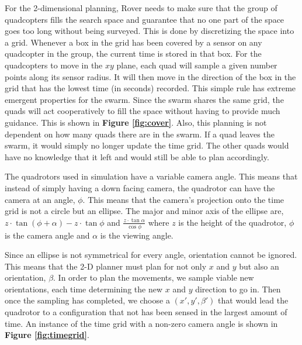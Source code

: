 \documentclass[12pt]{article}
\newcommand{\fig}[1]{\textbf{Figure \ref{fig:#1}}}
\begin{document}
For the 2-dimensional planning, Rover needs to make sure that the group of
quadcopters fills the search space and guarantee that no one part of the space
goes too long without being surveyed. This is done by discretizing the space
into a grid. Whenever a box in the grid has been covered by a sensor on any
quadcopter in the group, the current time is stored in that box.  For the
quadcopters to move in the $xy$ plane, each quad will sample a given number
points along its sensor radius. It will then move in the direction of the box
in the grid that has the lowest time (in seconds) recorded. This simple rule
has extreme emergent properties for the swarm. Since the swarm shares the same
grid, the quads will act cooperatively to fill the space without having to
provide much guidance. This is shown in \fig{cover}. Also, this planning is not
dependent on how many quads there are in the swarm. If a quad leaves the swarm,
it would simply no longer update the time grid. The other quads would have no
knowledge that it left and would still be able to plan accordingly. 

The quadrotors used in simulation have a variable camera angle. This means that
instead of simply having a down facing camera, the quadrotor can have the
camera at an angle, $\phi$. This means that the camera's projection onto the
time grid is not a circle but an ellipse. The major and minor axis of the
ellipse are, $ z \cdot \tan{(\phi + \alpha)} - z \cdot \tan{\phi} $ and $
\frac{z \cdot \tan{\alpha}}{\cos{\phi}} $ where $z$ is the height of the
quadrotor, $\phi$ is the camera angle and $\alpha$ is the viewing angle.

Since an ellipse is not symmetrical for every angle, orientation cannot be
ignored.  This means that the 2-D planner must plan for not only $x$ and $y$
but also an orientation, $\beta$. In order to plan the movements, we sample
viable new orientations, each time determining the new $x$ and $y$ direction to
go in.  Then once the sampling has completed, we choose a $(x', y',
\beta')$ that would lead the quadrotor to a configuration that not has been
sensed in the largest amount of time. An instance of the time grid with a
non-zero camera angle is shown in \fig{timegrid}.
\end{document}
